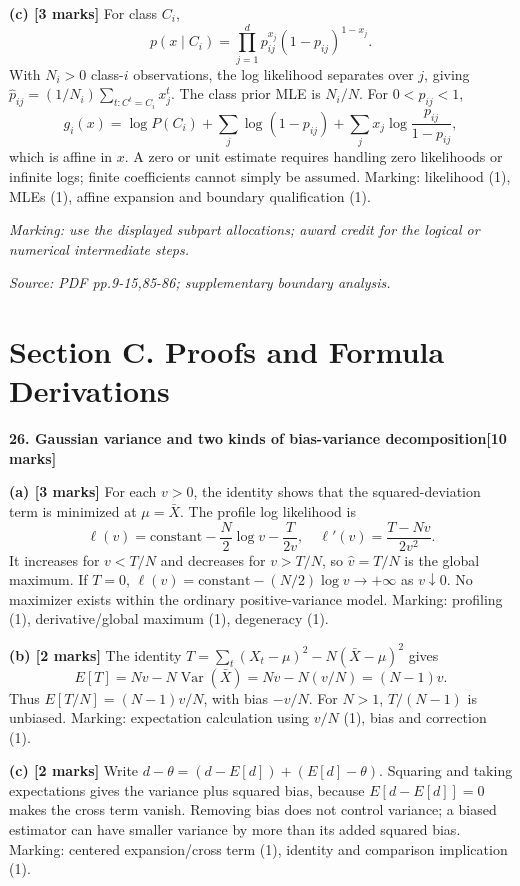 \documentclass[11pt,a4paper]{article}
\begin{document}
\textbf{(c) [3 marks]} For class \(C_i\),
\[
p(x\mid C_i)=\prod_{j=1}^d p_{ij}^{x_j}(1-p_{ij})^{1-x_j}.
\]
With \(N_i>0\) class-\(i\) observations, the log likelihood separates over \(j\), giving \(\hat p_{ij}=(1/N_i)\sum_{t:C^t=C_i}x_j^t\). The class prior MLE is \(N_i/N\). For \(0<p_{ij}<1\),
\[
g_i(x)=\log P(C_i)+\sum_j\log(1-p_{ij})
+\sum_jx_j\log\frac{p_{ij}}{1-p_{ij}},
\]
which is affine in \(x\). A zero or unit estimate requires handling zero likelihoods or infinite logs; finite coefficients cannot simply be assumed. Marking: likelihood (1), MLEs (1), affine expansion and boundary qualification (1).

\textit{Marking: use the displayed subpart allocations; award credit for the logical or numerical intermediate steps.}\par
{\footnotesize\textit{Source: PDF pp.9-15,85-86; supplementary boundary analysis.}}
\newpage\section*{Section C. Proofs and Formula Derivations}
\textbf{26. Gaussian variance and two kinds of bias-variance decomposition}\hfill\textbf{[10 marks]}\par\medskip
\textbf{(a) [3 marks]} For each \(v>0\), the identity shows that the squared-deviation term is minimized at \(\mu=\bar X\). The profile log likelihood is
\[
\ell(v)=\text{constant}-\frac N2\log v-\frac{T}{2v},
\quad
\ell'(v)=\frac{T-Nv}{2v^2}.
\]
It increases for \(v<T/N\) and decreases for \(v>T/N\), so \(\hat v=T/N\) is the global maximum. If \(T=0\), \(\ell(v)=\text{constant}-(N/2)\log v\to+\infty\) as \(v\downarrow0\). No maximizer exists within the ordinary positive-variance model. Marking: profiling (1), derivative/global maximum (1), degeneracy (1).

\textbf{(b) [2 marks]} The identity \(T=\sum_t(X_t-\mu)^2-N(\bar X-\mu)^2\) gives
\[
E[T]=Nv-N\operatorname{Var}(\bar X)
=Nv-N(v/N)=(N-1)v.
\]
Thus \(E[T/N]=(N-1)v/N\), with bias \(-v/N\). For \(N>1\), \(T/(N-1)\) is unbiased. Marking: expectation calculation using \(v/N\) (1), bias and correction (1).

\textbf{(c) [2 marks]} Write \(d-\theta=(d-E[d])+(E[d]-\theta)\). Squaring and taking expectations gives the variance plus squared bias, because \(E[d-E[d]]=0\) makes the cross term vanish. Removing bias does not control variance; a biased estimator can have smaller variance by more than its added squared bias. Marking: centered expansion/cross term (1), identity and comparison implication (1).
\end{document}
